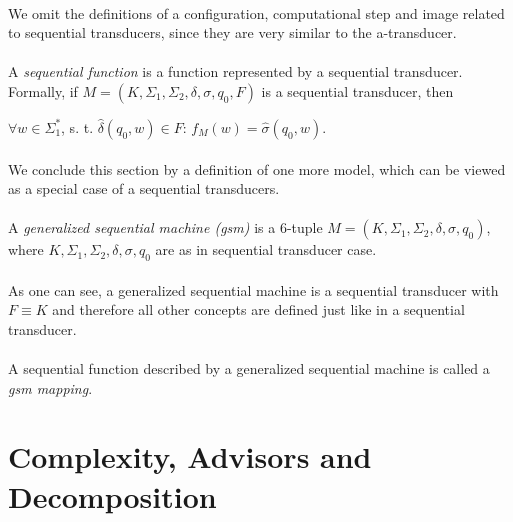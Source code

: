 \paragraph{}
We omit the definitions of a configuration, computational step and image related to sequential transducers, since they are very similar to the a-transducer.

\paragraph{}
 A \emph{sequential function} is a function represented by a sequential transducer. Formally, if $M=(K, \Sigma_{1}, \Sigma_{2}, \delta, \sigma, q_{0}, F)$ is a sequential transducer, then \\
\centerline{$\forall w \in \Sigma_{1}^{*}$, s. t. $\hat{\delta}(q_{0}, w) \in F$: $f_{M}(w) = \hat{\sigma}(q_{0}, w)$.}

\paragraph{}
We conclude this section by a definition of one more model, which can be viewed as a special case of a sequential transducers.

\paragraph{}
 A \emph{generalized sequential machine (gsm)} is a 6-tuple $M=(K, \Sigma_{1}, \Sigma_{2}, \delta, \sigma, q_{0})$, where $K, \Sigma_{1}, \Sigma_{2}, \delta, \sigma, q_{0}$ are as in sequential transducer case.

\paragraph{}
As one can see, a generalized sequential machine is a sequential transducer with $F \equiv K$ and therefore all other concepts are defined just like in a sequential transducer.

\paragraph{}
\oznacenie A sequential function described by a generalized sequential machine is called a \emph{gsm mapping}.

\section{Complexity, Advisors and Decomposition}

